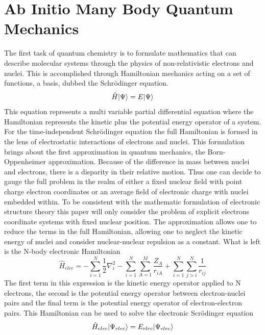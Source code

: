 
\section{Ab Initio Many Body Quantum Mechanics}
 The first task of quantum chemistry is to formulate mathematics that can describe molecular systems through the physics of non-relativistic electrons and nuclei. This is accomplished through Hamiltonian mechanics acting on a set of functions, a basis, dubbed the Schr{\"o}dinger equation.
   \begin{equation}
    \hat{H}| \Psi \rangle = E| \Psi \rangle
   \end{equation}
 This equation represents a multi variable partial differential equation where the Hamiltonian represents the kinetic plus the potential energy operator of a system.  For the time-independent Schr{\"o}dinger equation the full Hamiltonian is formed in the lens of electrostatic interactions of electrons and nuclei.  This formulation brings about the first approximation in quantum mechanics, the Born-Oppenheimer approximation.\cite{Szabo 1996}  Because of the difference in mass between nuclei and electrons, there is a disparity in their relative motion.  Thus one can decide to gauge the full problem in the realm of either a fixed nuclear field with point charge electron coordinates or an average field of electronic charge with nuclei embedded within. To be consistent with the mathematic formulation of electronic structure theory this paper will only consider the problem of explicit electrons coordinate systems with fixed nuclear position.  The approximation allows one to reduce the terms in the full Hamiltonian, allowing one to neglect the kinetic energy of nuclei and consider nuclear-nuclear repulsion as a constant.  What is left is the N-body electronic Hamiltonian
   \begin{equation}
    \hat{H}_{elec} = -\sum_{i=1}^{N} \frac{1}{2} \nabla_{i}^{2} - \sum_{i=1}^{N}\sum_{A=1}^{M} \frac{Z_A}{r_{iA}} + \sum_{i=1}^{N}\sum_{j>i}^{N} \frac{1}{r_{ij}}
   \end{equation}
  The first term in this expression is the kinetic energy operator applied to N electrons, the second is the potential energy operator between electron-nuclei pairs and the final term is the potential energy operator of electron-electron pairs.  This Hamiltonian can be used to solve the electronic Scr{\"o}dinger equation
    \begin{equation}
     \hat{H}_{elec} | \Psi_{elec} \rangle = E_{elec}| \Psi_{elec} \rangle
    \end{equation}
